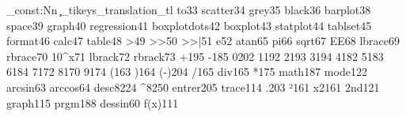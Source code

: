 %
%
%
\ExplSyntaxOn
{}%
%
\tl_const:Nn \c_tikeys_translation_tl{%
    {to}{33}%
    {scatter}{34}%
    {grey}{35}%
    {black}{36}%
    {barplot}{38}%
    {space}{39}%
    {graph}{40}%
    {regression}{41}%
    {boxplotdots}{42}%
    {boxplot}{43}%
    {statplot}{44}%
    {tablset}{45}%
    {format}{46}%
    {calc}{47}%
    {table}{48}%
    {>}{49}%
    {>>}{50}%
    {>>|}{51}%
    {e}{52}%
    {atan}{65}%
    {pi}{66}%
    {sqrt}{67}%
    {EE}{68}%
    {lbrace}{69}%
    {rbrace}{70}%
    {10^x}{71}%
    {lbrack}{72}%
    {rbrack}{73}%
    {+}{195}%
    {-}{185}%
    {0}{202}%
    {1}{192}%
    {2}{193}%
    {3}{194}%
    {4}{182}%
    {5}{183}%
    {6}{184}%
    {7}{172}%
    {8}{170}%
    {9}{174}%
    {(}{163}%
    {)}{164}%
    {(-)}{204}%
    {/}{165}%
    {div}{165}%
    {*}{175}%
    {math}{187}%
    {mode}{122}%
    {arcsin}{63}%
    {arccos}{64}%
    {desc}{8224}%
    {^}{8250}%
    {entrer}{205}%
    {trace}{114}%
    {.}{203}%
    {²}{161}%
    {x2}{161}%
    {2nd}{121}%
    {graph}{115}%
    {prgm}{188}%
    {dessin}{60}%
    {f(x)}{111}%
}%
%
%
\ExplSyntaxOff
%
%
%
%
\newcommand\ticalc[1][16]{%
    \ifhmode\par\fi
    \begingroup
        \parindent0pt%
        \def\nbchar{#1}%
        \catcode`\;12%
        \catcode`\:12%
        \catcode`\!12%
        \catcode`\?12%
        \catcode`\^^M12%
        \catcode`\ 12%
        \catcode`\112
        \ticalci
        }%
%
%
%
\newcommand\ticalci[1]{%
        \normalsize\TIfont\FrameSep=5pt%
        \hsize\dimexpr0.8em*\nbchar+2\FrameSep\relax
        \def\>{%
            \hbox{%
                -\llap{\lower0.122em\hbox{`}\llap{\lower0.366em\hbox{\reflectbox{`}}\kern0.122em }}%
                }%
            }%
        \def\!{\hbox{=\llap{/}}}%
        \def\1{\hbox{\bfseries\scriptsize{1}}}%
        \csname shaded*\endcsname\leavevmode\ticalcii#1\relax\csname endshaded*\endcsname
    \endgroup
    }%
%
%
%
\newcommand\ticalcminibox[1][16]{%
    \ifhmode\par\fi
    \begingroup
        \parindent0pt \fboxrule=1pt \fboxsep=4pt%
        \def\nbchar{#1}%
        \catcode`\;12%
        \catcode`\112%
        \catcode`\:12%
        \catcode`\!12%
        \catcode`\?12%
        \catcode`\^^M12%
        \catcode`\ 12%
        \normalsize\TIfont
        \def\>{%
            \hbox{%
                -\llap{%
                    \lower0.122em%
                    \hbox{`}%
                    \llap{\lower0.366em\hbox{\reflectbox{`}}\kern0.122em }%
                    \kern-0.122em%
                    }%
                }%
            }%
        \def\!{\hbox{=\llap{/}}}%
        \def\1{\hbox{\bfseries\scriptsize{1}}}%
        \ticalcminiboxi
    }%
